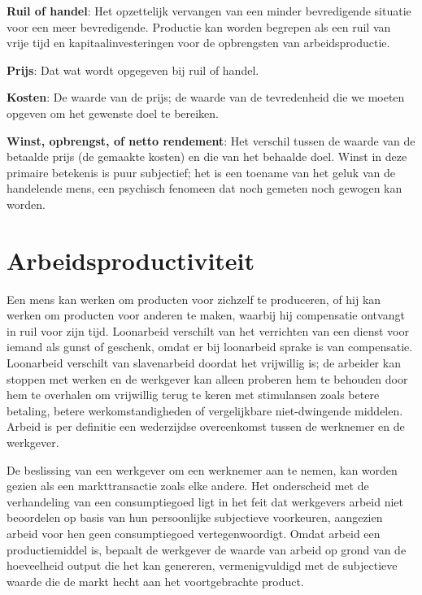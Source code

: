 \textbf{Ruil of handel}: Het opzettelijk vervangen van een minder
bevredigende situatie voor een meer bevredigende. Productie kan worden
begrepen als een ruil van vrije tijd en kapitaalinvesteringen voor de
opbrengsten van arbeidsproductie.

\textbf{Prijs}: Dat wat wordt opgegeven bij ruil of handel.

\textbf{Kosten}: De waarde van de prijs; de waarde van de tevredenheid
die we moeten opgeven om het gewenste doel te bereiken.

\textbf{Winst, opbrengst, of netto rendement}: Het verschil tussen de
waarde van de betaalde prijs (de gemaakte kosten) en die van het
behaalde doel. Winst in deze primaire betekenis is puur subjectief; het
is een toename van het geluk van de handelende mens, een psychisch
fenomeen dat noch gemeten noch gewogen kan worden.


\section{Arbeidsproductiviteit}

Een mens kan werken om producten voor zichzelf te produceren, of hij kan
werken om producten voor anderen te maken, waarbij hij compensatie
ontvangt in ruil voor zijn tijd. Loonarbeid verschilt van het verrichten
van een dienst voor iemand als gunst of geschenk, omdat er bij
loonarbeid sprake is van compensatie. Loonarbeid verschilt van
slavenarbeid doordat het vrijwillig is; de arbeider kan stoppen met
werken en de werkgever kan alleen proberen hem te behouden door hem te overhalen om vrijwillig terug te keren met stimulansen zoals
betere betaling, betere werkomstandigheden of vergelijkbare
niet-dwingende middelen. Arbeid is per definitie een wederzijdse
overeenkomst tussen de werknemer en de werkgever.

De beslissing van een werkgever om een werknemer aan te nemen, kan worden gezien als een markttransactie zoals elke andere. Het onderscheid met de verhandeling van een consumptiegoed ligt in het feit dat werkgevers arbeid niet beoordelen op basis van hun persoonlijke subjectieve voorkeuren, aangezien arbeid voor hen geen consumptiegoed vertegenwoordigt. Omdat arbeid een productiemiddel is, bepaalt de werkgever de waarde van arbeid op grond van de hoeveelheid output die het kan genereren, vermenigvuldigd met de subjectieve waarde die de markt hecht aan het voortgebrachte product.

